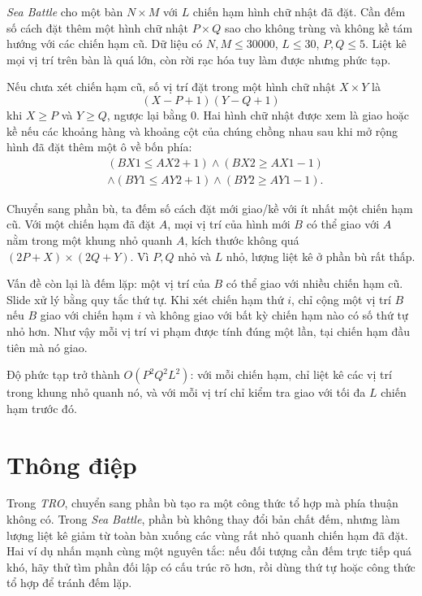 \documentclass[11pt]{article}
\begin{document}
\textit{Sea Battle} cho một bàn \(N\times M\) với \(L\) chiến hạm hình chữ
nhật đã đặt. Cần đếm số cách đặt thêm một hình chữ nhật \(P\times Q\) sao cho
không trùng và không kề tám hướng với các chiến hạm cũ. Dữ liệu có
\(N,M\le 30000\), \(L\le 30\), \(P,Q\le 5\). Liệt kê mọi vị trí trên bàn là
quá lớn, còn rời rạc hóa tuy làm được nhưng phức tạp.

Nếu chưa xét chiến hạm cũ, số vị trí đặt trong một hình chữ nhật
\(X\times Y\) là
\[
  (X-P+1)(Y-Q+1)
\]
khi \(X\ge P\) và \(Y\ge Q\), ngược lại bằng \(0\). Hai hình chữ nhật được
xem là giao hoặc kề nếu các khoảng hàng và khoảng cột của chúng chồng nhau
sau khi mở rộng hình đã đặt thêm một ô về bốn phía:
\[
\begin{aligned}
  &(BX1\le AX2+1)\land(BX2\ge AX1-1)\\
  &\land(BY1\le AY2+1)\land(BY2\ge AY1-1).
\end{aligned}
\]

Chuyển sang phần bù, ta đếm số cách đặt mới giao/kề với ít nhất một chiến
hạm cũ. Với một chiến hạm đã đặt \(A\), mọi vị trí của hình mới \(B\) có thể
giao với \(A\) nằm trong một khung nhỏ quanh \(A\), kích thước không quá
\((2P+X)\times(2Q+Y)\). Vì \(P,Q\) nhỏ và \(L\) nhỏ, lượng liệt kê ở phần bù
rất thấp.

Vấn đề còn lại là đếm lặp: một vị trí của \(B\) có thể giao với nhiều chiến
hạm cũ. Slide xử lý bằng quy tắc thứ tự. Khi xét chiến hạm thứ \(i\), chỉ
cộng một vị trí \(B\) nếu \(B\) giao với chiến hạm \(i\) và không giao với
bất kỳ chiến hạm nào có số thứ tự nhỏ hơn. Như vậy mỗi vị trí vi phạm được
tính đúng một lần, tại chiến hạm đầu tiên mà nó giao.

Độ phức tạp trở thành \(O(P^2Q^2L^2)\): với mỗi chiến hạm, chỉ liệt kê các vị
trí trong khung nhỏ quanh nó, và với mỗi vị trí chỉ kiểm tra giao với tối đa
\(L\) chiến hạm trước đó.

\section{Thông điệp}

Trong \textit{TRO}, chuyển sang phần bù tạo ra một công thức tổ hợp mà phía
thuận không có. Trong \textit{Sea Battle}, phần bù không thay đổi bản chất
đếm, nhưng làm lượng liệt kê giảm từ toàn bàn xuống các vùng rất nhỏ quanh
chiến hạm đã đặt. Hai ví dụ nhấn mạnh cùng một nguyên tắc: nếu đối tượng cần
đếm trực tiếp quá khó, hãy thử tìm phần đối lập có cấu trúc rõ hơn, rồi dùng
thứ tự hoặc công thức tổ hợp để tránh đếm lặp.
\end{document}
